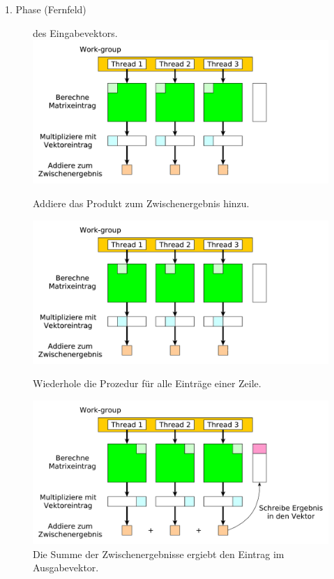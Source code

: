 \documentclass[10pt]{beamer}
\begin{document}
\begin{frame}{1. Phase (Fernfeld)}
\begin{figure}
\begin{overprint}
{                 des Eingabevektors.}
        \centering
        \includegraphics[width=\linewidth]{figures/fg-ff-add-interim-result.pdf}
        \caption{Addiere das Produkt zum Zwischenergebnis hinzu.}
        \centering
        \includegraphics[width=\linewidth]{figures/fg-ff-next-column.pdf}
        \caption{Wiederhole die Prozedur f\"ur alle Eintr\"age einer Zeile.}
        \centering
        \includegraphics[width=\linewidth]{figures/fg-ff-write-result.pdf}
        \caption{Die Summe der Zwischenergebnisse ergiebt den Eintrag im
                 Ausgabevektor.}
    \end{overprint}
  \end{figure}
\end{frame}
\end{document}
